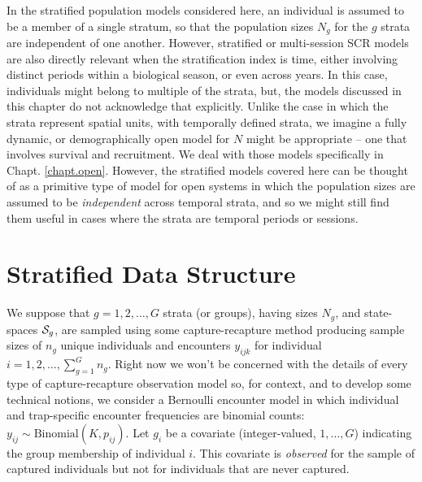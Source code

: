 In the stratified population models considered here, an individual is
assumed to be a member of a single stratum, so that the population
sizes $N_{g}$ for the $g$ strata  are independent of one another. However,
stratified or multi-session SCR models are also directly relevant when
the stratification index is time, either involving distinct periods within
a biological season, or even across years. In this case, individuals
might belong to multiple of the strata, but, the models discussed in
this chapter do not acknowledge that explicitly.
Unlike the case in which the strata represent spatial units, with
temporally defined strata, we imagine a fully dynamic, or
demographically open model for $N$ might be appropriate -- one that
involves survival and recruitment. We deal with those models
specifically in Chapt. \ref{chapt.open}.  However, the stratified
models covered here can be thought of as a primitive type of model for
open systems in which the population sizes are assumed to be {\it
  independent} across temporal strata, and so we might still find them
useful in cases where the strata are temporal periods or sessions.

\section{Stratified Data Structure}


We suppose that $g=1,2,\ldots,G$ strata (or groups), having sizes
$N_{g}$, and state-spaces ${\cal S}_{g}$, are sampled using some
capture-recapture method producing sample sizes of $n_{g}$ unique
individuals and encounters $y_{ijk}$ for individual $i=1,2,\ldots,
\sum_{g=1}^{G} n_{g}$.  Right now we won't be concerned with the
details of every type of capture-recapture observation model so, for
context, and to develop some technical notions, we consider a
Bernoulli encounter model in which individual and trap-specific
encounter frequencies are binomial counts: $y_{ij} \sim
\mbox{Binomial}(K,p_{ij})$.  Let $g_{i}$ be a covariate
(integer-valued, $1, \ldots, G$) indicating the group membership of
individual $i$. This covariate is {\it observed} for the sample of
captured individuals but not for individuals that are never captured.

